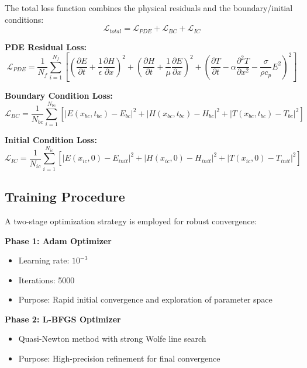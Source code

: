 \documentclass[11pt,a4paper]{article}
\begin{document}
The total loss function combines the physical residuals and the boundary/initial conditions:
\begin{equation}
    \mathcal{L}_{total} = \mathcal{L}_{PDE} + \mathcal{L}_{BC} + \mathcal{L}_{IC}
\end{equation}

\textbf{PDE Residual Loss:}
\begin{equation}
    \mathcal{L}_{PDE} = \frac{1}{N_f} \sum_{i=1}^{N_f} \left[ \left(\frac{\partial E}{\partial t} + \frac{1}{\epsilon} \frac{\partial H}{\partial x}\right)^2 + \left(\frac{\partial H}{\partial t} + \frac{1}{\mu} \frac{\partial E}{\partial x}\right)^2 + \left(\frac{\partial T}{\partial t} - \alpha \frac{\partial^2 T}{\partial x^2} - \frac{\sigma}{\rho c_p} E^2\right)^2 \right]
\end{equation}

\textbf{Boundary Condition Loss:}
\begin{equation}
    \mathcal{L}_{BC} = \frac{1}{N_{bc}} \sum_{i=1}^{N_{bc}} \left[ |E(x_{bc}, t_{bc}) - E_{bc}|^2 + |H(x_{bc}, t_{bc}) - H_{bc}|^2 + |T(x_{bc}, t_{bc}) - T_{bc}|^2 \right]
\end{equation}

\textbf{Initial Condition Loss:}
\begin{equation}
    \mathcal{L}_{IC} = \frac{1}{N_{ic}} \sum_{i=1}^{N_{ic}} \left[ |E(x_{ic}, 0) - E_{init}|^2 + |H(x_{ic}, 0) - H_{init}|^2 + |T(x_{ic}, 0) - T_{init}|^2 \right]
\end{equation}

\subsection{Training Procedure}

A two-stage optimization strategy is employed for robust convergence:

\textbf{Phase 1: Adam Optimizer}
\begin{itemize}
    \item Learning rate: $10^{-3}$
    \item Iterations: 5000
    \item Purpose: Rapid initial convergence and exploration of parameter space
\end{itemize}

\textbf{Phase 2: L-BFGS Optimizer}
\begin{itemize}
    \item Quasi-Newton method with strong Wolfe line search
    \item Purpose: High-precision refinement for final convergence
\end{itemize}
\end{document}
